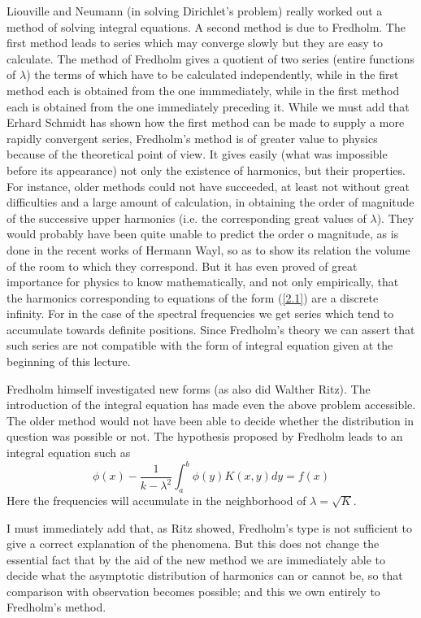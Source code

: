 \documentclass[12pt,oneside]{book}
\begin{document}
Liouville and Neumann (in solving Dirichlet's problem) really worked out a method of solving integral equations. A second method is due to Fredholm. The first method leads to series which may converge slowly but they are easy to calculate. The method of Fredholm gives a quotient of two series (entire functions of $\lambda$) the terms of which have to be calculated independently, while in the first method each is obtained from the one immmediately, while in the first method each is obtained from the one immediately preceding it. While we must add that Erhard Schmidt has shown how the first method can be made to supply a more rapidly convergent series, Fredholm's method is of greater value to physics because of the theoretical point of view. It gives easily (what was impossible before its appearance) not only the existence of harmonics, but their properties. For instance, older methods could not have succeeded, at least not without great difficulties and a large amount of calculation, in obtaining the order of magnitude of the successive upper harmonics (i.e. the corresponding great values of $\lambda$). They would probably have been quite unable to predict the order o magnitude, as is done in the recent works of Hermann Wayl, so as to show its relation the volume of the room to which they correspond. But it has even proved of great importance for physics to know mathematically, and not only empirically, that the harmonics corresponding to equations of the form (\ref{2.1}) are a discrete infinity. For in the case of the spectral frequencies we get series which tend to accumulate towards definite positions. Since Fredholm's theory we can assert that such series are not compatible with the form of integral equation given at the beginning of this lecture. \par

Fredholm himself investigated new forms (as also did Walther Ritz). The introduction of the integral equation has made even the above problem accessible. The older method would not have been able to decide whether the distribution in question was possible or not. The hypothesis proposed by Fredholm leads to an integral equation such as
\begin{equation}
    \label{2.2}
    \phi(x)-\frac{1}{k-\lambda^2}\int_a^b\phi(y)K(x,y)dy=f(x)
\end{equation}
Here the frequencies will accumulate in the neighborhood of $\lambda=\sqrt{K}$. \par

I must immediately add that, as Ritz showed, Fredholm's type is not sufficient to give a correct explanation of the phenomena. But this does not change the essential fact that by the aid of the new method we are immediately able to decide what the asymptotic distribution of harmonics can or cannot be, so that comparison with observation becomes possible; and this we own entirely to Fredholm's method. \par
\end{document}

